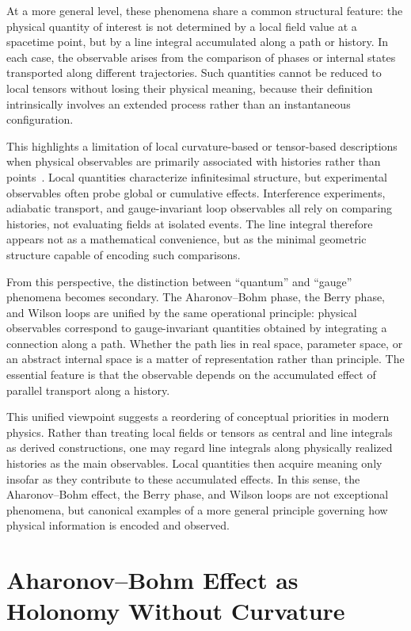 \documentclass[%
 reprint,
 amsmath,amssymb,
 aps,
 prb,
]{revtex4-2}
\numberwithin{equation}{section}
\begin{document}
At a more general level, these phenomena share a common structural feature: the physical quantity of interest is not determined by a local field value at a spacetime point, but by a line integral accumulated along a path or history. In each case, the observable arises from the comparison of phases or internal states transported along different trajectories. Such quantities cannot be reduced to local tensors without losing their physical meaning, because their definition intrinsically involves an extended process rather than an instantaneous configuration.

This highlights a limitation of local curvature-based or tensor-based descriptions when physical observables are primarily associated with histories rather than points~\cite{Nakahara2003}. Local quantities characterize infinitesimal structure, but experimental observables often probe global or cumulative effects. Interference experiments, adiabatic transport, and gauge-invariant loop observables all rely on comparing histories, not evaluating fields at isolated events. The line integral therefore appears not as a mathematical convenience, but as the minimal geometric structure capable of encoding such comparisons.

From this perspective, the distinction between ``quantum'' and ``gauge'' phenomena becomes secondary. The Aharonov--Bohm phase, the Berry phase, and Wilson loops are unified by the same operational principle: physical observables correspond to gauge-invariant quantities obtained by integrating a connection along a path. Whether the path lies in real space, parameter space, or an abstract internal space is a matter of representation rather than principle. The essential feature is that the observable depends on the accumulated effect of parallel transport along a history.

This unified viewpoint suggests a reordering of conceptual priorities in modern physics. Rather than treating local fields or tensors as central and line integrals as derived constructions, one may regard line integrals along physically realized histories as the main observables. Local quantities then acquire meaning only insofar as they contribute to these accumulated effects. In this sense, the Aharonov--Bohm effect, the Berry phase, and Wilson loops are not exceptional phenomena, but canonical examples of a more general principle governing how physical information is encoded and observed.


\section{Aharonov--Bohm Effect as Holonomy Without Curvature}
\label{sec:ab_holonomy_without_curvature}
\end{document}
